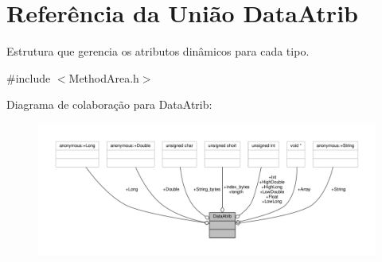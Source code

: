 \hypertarget{unionDataAtrib}{}\section{Referência da União Data\+Atrib}
\label{unionDataAtrib}


Estrutura que gerencia os atributos dinâmicos para cada tipo.  




{\ttfamily \#include $<$Method\+Area.\+h$>$}



Diagrama de colaboração para Data\+Atrib\+:
\nopagebreak
\begin{figure}[H]
\begin{center}
\leavevmode
\includegraphics[width=350pt]{unionDataAtrib__coll__graph}
\end{center}
\end{figure}

